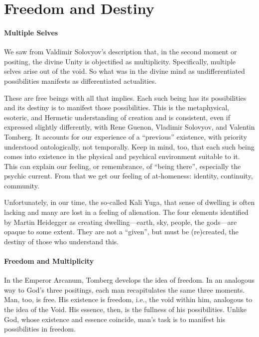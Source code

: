 \section{Freedom and Destiny}

\paragraph{Multiple Selves}


We saw from Valdimir Solovyov's description that, in the second moment or positing, the divine Unity is objectified as multiplicity. Specifically, multiple selves arise out of the void. So what was in the divine mind as undifferentiated possibilities manifests as differentiated actualities.

These are free beings with all that implies. Each such being has its possibilities and its destiny is to manifest those possibilities. This is the metaphysical, esoteric, and Hermetic understanding of creation and is consistent, even if expressed slightly differently, with Rene Guenon, Vladimir Solovyov, and Valentin Tomberg. It accounts for our experience of a ``previous'' existence, with priority understood ontologically, not temporally. Keep in mind, too, that each such being comes into existence in the physical and psychical environment suitable to it. This can explain our feeling, or remembrance, of ``being there'', especially the psychic current. From that we get our feeling of at-homeness: identity, continuity, community.

Unfortunately, in our time, the so-called Kali Yuga, that sense of dwelling is often lacking and many are lost in a feeling of alienation. The four elements identified by Martin Heidegger as creating dwelling---earth, sky, people, the gods---are opaque to some extent. They are not a ``given'', but must be (re)created, the destiny of those who understand this.

\paragraph{Freedom and Multiplicity}


In the Emperor Arcanum, Tomberg develops the idea of freedom. In an analogous way to God's three positings, each man recapitulates the same three moments. Man, too, is free. His existence is freedom, i.e., the void within him, analogous to the idea of the Void. His essence, then, is the fullness of his possibilities. Unlike God, whose existence and essence coincide, man's task is to manifest his possibilities in freedom.

